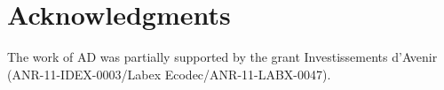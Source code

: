 \documentclass[a4paper,bej,preprint,reqno]{imsart}
\begin{document}
\section*{Acknowledgments}
The work of AD was partially supported by the grant
Investissements d'Avenir (ANR-11-IDEX-0003/Labex Ecodec/ANR-11-LABX-0047).






{\renewcommand{\addtocontents}[2]{}
}
\end{document}
